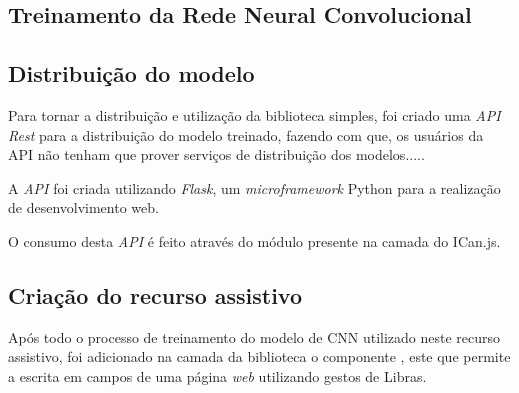 
\subsection{Treinamento da Rede Neural Convolucional}


\subsection{Distribuição do modelo}

\par Para tornar a distribuição e utilização da biblioteca simples, foi criado uma \textit{API Rest} para a distribuição do modelo treinado, fazendo com que, os usuários da API não tenham que prover serviços de distribuição dos modelos.....
\par A \textit{API} foi criada utilizando \textit{Flask}, um \textit{microframework} Python para a realização de desenvolvimento web.


\par O consumo desta \textit{API} é feito através do módulo  presente na camada  do ICan.js.


\subsection{Criação do recurso assistivo}

\par Após todo o processo de treinamento do modelo de CNN utilizado neste recurso assistivo, foi adicionado na camada  da biblioteca o componente , este que permite a escrita em campos de uma página \textit{web} utilizando gestos de Libras.

